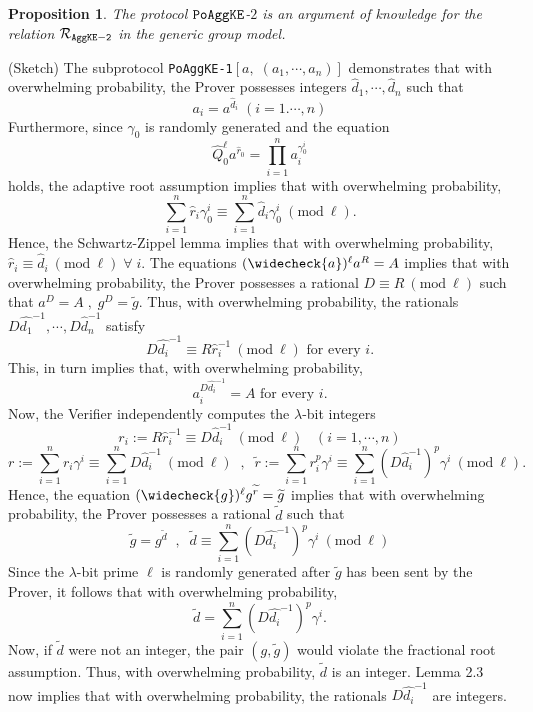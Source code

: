 \documentclass[11pt, lettersize, notitlepage, leqno, footskip=0.6cm]{article}
\newcommand{\pl}{\prod\limits}
\newcommand{\slim}{\sum\limits}
\newcommand{\wti}{\widetilde}
\newcommand{\mc}{\mathcal}
\newcommand{\lam}{\lambda}
\newcommand{\what}{\widehat}
\newcommand{\weck}{\widecheck}
\newcommand{\vs}{\vspace{-0.15cm}}
\newcommand{\op}{overwhelming probability}
\newcommand{\Mod}[1]{\ (\mathrm{mod}\ #1)}
\newtheorem{Prop}[Thm]{Proposition}
\numberwithin{equation}{section}
\begin{document}
\vspace{0.2cm}

\begin{Prop} The protocol $\tt{PoAggKE}$-$2$ is an argument of knowledge for the relation $\mc{R}_{{\tt{AggKE-2}}}$ in the generic group model.\end{Prop}

\begin{prf} (Sketch) The subprotocol \verb|PoAggKE-1|$[a,\;(a_1,\cdots,a_n)]$ demonstrates that with \op, the Prover possesses integers $\what{d}_1,\cdots,\what{d}_n$ such that \vs $$a_i = a^{\what{d}_i}\; (i=1.\cdots,n)$$ Furthermore, since $\gamma_0$ is randomly generated and the equation \vs $$\what{Q}_0^{\ell}a^{\what{r}_0} = \pl_{i=1}^{n} a_i^{\gamma_0^i} $$ holds, the adaptive root assumption implies that with \op, \vs $$\slim_{i=1}^n\what{r}_i\gamma_0^i\equiv \slim_{i=1}^n \what{d}_i\gamma_0^i\Mod{\ell}.$$ Hence, the Schwartz-Zippel lemma implies that with \op, $\what{r}_i\equiv \what{d}_i\Mod{\ell}\;\forall\; i$. The equations \vs $(\weck{a})^{\ell}a^R= A$ implies that with \op, the Prover possesses a rational $D\equiv R\Mod{\ell}$ such that $a^D = A\;,\;g^D = \wti{g}$. Thus, with \op, the rationals $D\what{d_1}^{-1},\cdots,D\what{d}_n^{-1}$ satisfy \vs $$D\what{d_i}^{-1}\equiv R\what{r}_i^{-1}\Mod{\ell} \text{ for every }i.$$ This, in turn implies that, with \op, \vs $$a_i^{D\what{d_i}^{-1}} = A \text{ for every }i.$$ Now, the Verifier independently computes the $\lam$-bit integers \vs $$r_i:= R\what{r}_{i}^{-1}\equiv D\what{d}_i^{-1}\Mod{\ell}\;\;\;(i=1,\cdots,n)$$\vspace{-0.3cm} $$r:= \slim_{i=1}^n r_i\gamma^i\equiv \slim_{i=1}^n D\what{d}_i^{-1}\Mod{\ell}\;\;,\;\;\wti{r}:= {\slim_{i=1}^n r_i^{p}\gamma^i}\equiv {\slim_{i=1}^n (D\what{d}_i^{-1})^{p}\gamma^i}\Mod{\ell}.$$ Hence, the equation $(\weck{g})^{\ell}g^{\wti{r}} = \wti{g}$ implies that with \op, the Prover possesses a rational $\wti{d}$ such that \vs $$\wti{g} = g^{\wti{d}}\;\;,\;\;\wti{d}\equiv \slim_{i=1}^n (D\what{d_i}^{-1})^{{p}}\gamma^i\Mod{\ell}$$ Since the $\lam$-bit prime $\ell$ is randomly generated after $\wti{g}$ has been sent by the Prover, it follows that with \op, \vs $$\wti{d} = \slim_{i=1}^n (D\what{d_i}^{-1})^{{p}}\gamma^i. $$ Now, if $\wti{d}$ were not an integer, the pair $(g, \wti{g})$ would violate the fractional root assumption. Thus, with \op, $\wti{d}$ is an integer. Lemma 2.3 now implies that with \op, the rationals $D\what{d_i}^{-1}$ are integers.\end{prf}
\end{document}
